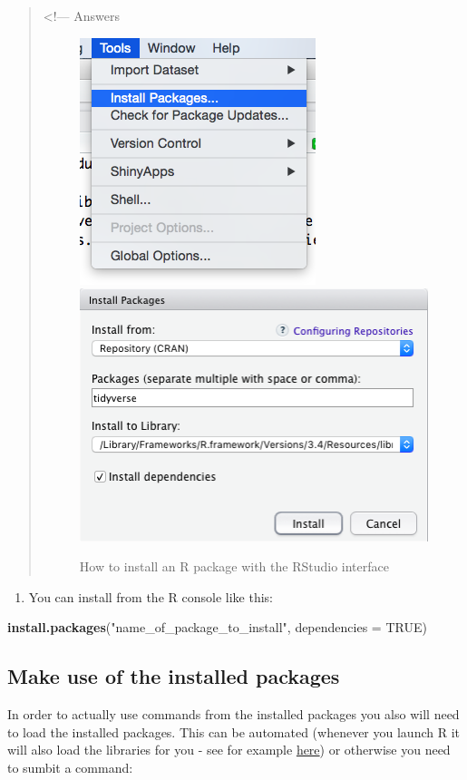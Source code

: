 \documentclass[]{book}
\newenvironment{Shaded}{\begin{snugshade}}{\end{snugshade}}
\newcommand{\KeywordTok}[1]{\textcolor[rgb]{0.13,0.29,0.53}{\textbf{{#1}}}}
\newcommand{\DataTypeTok}[1]{\textcolor[rgb]{0.13,0.29,0.53}{{#1}}}
\newcommand{\StringTok}[1]{\textcolor[rgb]{0.31,0.60,0.02}{{#1}}}
\newcommand{\OtherTok}[1]{\textcolor[rgb]{0.56,0.35,0.01}{{#1}}}
\newcommand{\NormalTok}[1]{{#1}}
\providecommand{\tightlist}{%
  \setlength{\itemsep}{0pt}\setlength{\parskip}{0pt}}
\theoremstyle{definition}
\theoremstyle{definition}
\theoremstyle{remark}
\begin{document}
\begin{quote}
\textless{}!--- Answers

\begin{figure}
\includegraphics[width=0.4\linewidth]{img/installpckg1} \includegraphics[width=0.4\linewidth]{img/installpckg2} \caption{How to install an R package with the RStudio interface}\label{fig:install-packages}
\end{figure}
\end{quote}

\begin{enumerate}
\def\labelenumi{\arabic{enumi}.}
\setcounter{enumi}{1}
\tightlist
\item
  You can install from the R console like this:
\end{enumerate}

\begin{Shaded}
\begin{Highlighting}[]
\KeywordTok{install.packages}\NormalTok{(}\StringTok{"name_of_package_to_install"}\NormalTok{, }\DataTypeTok{dependencies =} \OtherTok{TRUE}\NormalTok{)}
\end{Highlighting}
\end{Shaded}

\subsection{Make use of the installed
packages}\label{make-use-of-the-installed-packages}

In order to actually use commands from the installed packages you also
will need to load the installed packages. This can be automated
(whenever you launch R it will also load the libraries for you - see for
example \href{http://stackoverflow.com/a/14238658/2630957}{here}) or
otherwise you need to sumbit a command:
\end{document}
